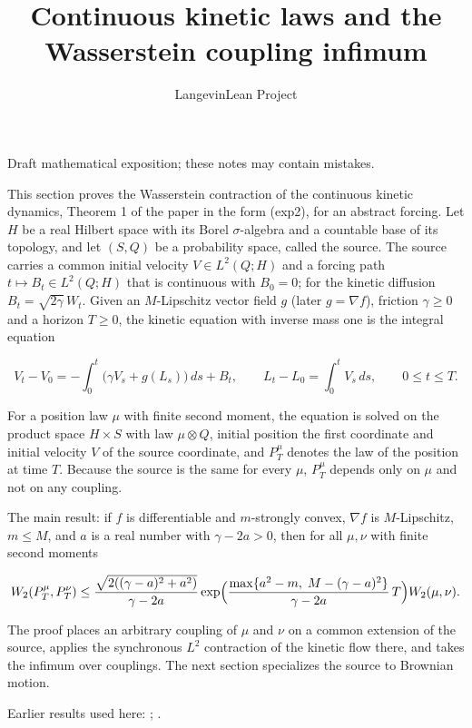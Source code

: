 \documentclass[11pt,a4paper]{article}
\title{\texorpdfstring{Continuous kinetic laws and the Wasserstein coupling infimum}{Continuous kinetic laws and the Wasserstein coupling infimum}}
\author{LangevinLean Project}
\date{}
\begin{document}
\maketitle
Draft mathematical exposition; these notes may contain mistakes.


This section proves the Wasserstein contraction of the continuous kinetic dynamics, Theorem 1 of the paper in the form (exp2), for an abstract forcing. Let \(H\) be a real Hilbert space with its Borel \(\sigma\)-algebra and a countable base of its topology, and let \((S,Q)\) be a probability space, called the source. The source carries a common initial velocity \(V\in L^2(Q;H)\) and a forcing path \(t\mapsto B_t\in L^2(Q;H)\) that is continuous with \(B_0=0\); for the kinetic diffusion \(B_t=\sqrt{2\gamma}\,W_t\). Given an \(M\)-Lipschitz vector field \(g\) (later \(g=\nabla f\)), friction \(\gamma\ge0\) and a horizon \(T\ge0\), the kinetic equation with inverse mass one is the integral equation


\[V_t-V_0=-\int_0^t\bigl(\gamma V_s+g(L_s)\bigr)\,ds+B_t,\qquad L_t-L_0=\int_0^tV_s\,ds,\qquad0\le t\le T.\]


For a position law \(\mu\) with finite second moment, the equation is solved on the product space \(H\times S\) with law \(\mu\otimes Q\), initial position the first coordinate and initial velocity \(V\) of the source coordinate, and \(P^\mu_T\) denotes the law of the position at time \(T\). Because the source is the same for every \(\mu\), \(P^\mu_T\) depends only on \(\mu\) and not on any coupling.




The main result: if \(f\) is differentiable and \(m\)-strongly convex, \(\nabla f\) is \(M\)-Lipschitz, \(m\le M\), and \(a\) is a real number with \(\gamma-2a>0\), then for all \(\mu,\nu\) with finite second moments


\[W_2(P^\mu_T,P^\nu_T)\le\frac{\sqrt{2((\gamma-a)^2+a^2)}}{\gamma-2a}\exp\Bigl(\frac{\max\{a^2-m,\;M-(\gamma-a)^2\}}{\gamma-2a}\,T\Bigr)W_2(\mu,\nu).\]


The proof places an arbitrary coupling of \(\mu\) and \(\nu\) on a common extension of the source, applies the synchronous \(L^2\) contraction of the kinetic flow there, and takes the infimum over couplings. The next section specializes the source to Brownian motion.



Earlier results used here: \cite[Section~3.21]{LangevinLean2026ULASC}; \cite[Section~3.18]{LangevinLean2026ULASC}.
\end{document}
